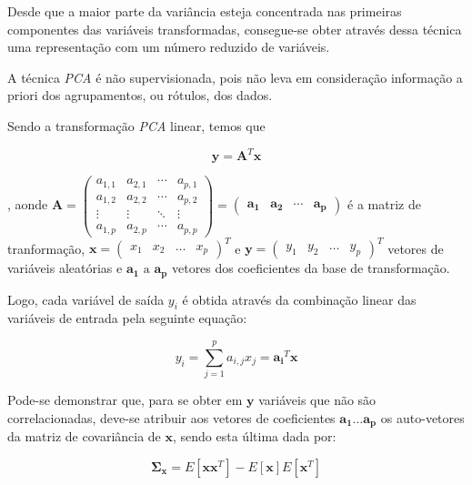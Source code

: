 Desde que a maior parte da variância esteja concentrada nas primeiras componentes das variáveis transformadas, consegue-se obter através dessa técnica uma representação com um número reduzido de variáveis.

A técnica \emph{PCA} é não supervisionada, pois não leva em consideração informação a priori dos agrupamentos, ou rótulos, dos dados.  

Sendo a transformação \emph{PCA} linear, temos que

\begin{equation}\label{eq:PCA1}
\mathbf{y}=\mathbf{A}^T\mathbf{x}
\end{equation}

, aonde $ \mathbf{A} = \begin{pmatrix}
  a_{1,1} & a_{2,1} & \cdots & a_{p,1} \\
  a_{1,2} & a_{2,2} & \cdots & a_{p,2} \\
  \vdots  & \vdots  & \ddots & \vdots  \\
  a_{1,p} & a_{2,p} & \cdots & a_{p,p}
 \end{pmatrix} = 
 \begin{pmatrix}
 \mathbf{a_{1}}&
 \mathbf{a_{2}}&
 \cdots&
 \mathbf{a_{p}}
 \end{pmatrix}$ é a matriz de tranformação, $\mathbf{x} = \begin{pmatrix} x_1&x_2&\ldots&x_p\end{pmatrix}^T$ e $\mathbf{y} = \begin{pmatrix}y_1&y_2&\ldots&y_p\end{pmatrix}^T$ vetores de variáveis aleatórias e $\mathbf{a_1}\text{ a }\mathbf{a_p}$ vetores dos coeficientes da base de transformação.
 
Logo, cada variável de saída $y_i$ é obtida através da combinação linear das variáveis de entrada pela seguinte equação:
 
 \begin{equation}\label{eq:PCA2}
 y_i = \sum\limits_{j = 1}^p a_{i,j}x_j = \mathbf{a_i}^T\mathbf{x}
 \end{equation}

Pode-se demonstrar que, para se obter em $\mathbf{y}$ variáveis que não são correlacionadas,  deve-se atribuir aos vetores de coeficientes $\mathbf{a_1} \ldots \mathbf{a_p}$ os auto-vetores da matriz de covariância de $\mathbf{x}$, sendo esta última dada por: 

\begin{equation}\label{eq:PCA3}
\mathbf{\Sigma_x} = E{[\mathbf{xx}^T]}-E{[\mathbf{x}]}E{[\mathbf{x}^T]}
\end{equation}

